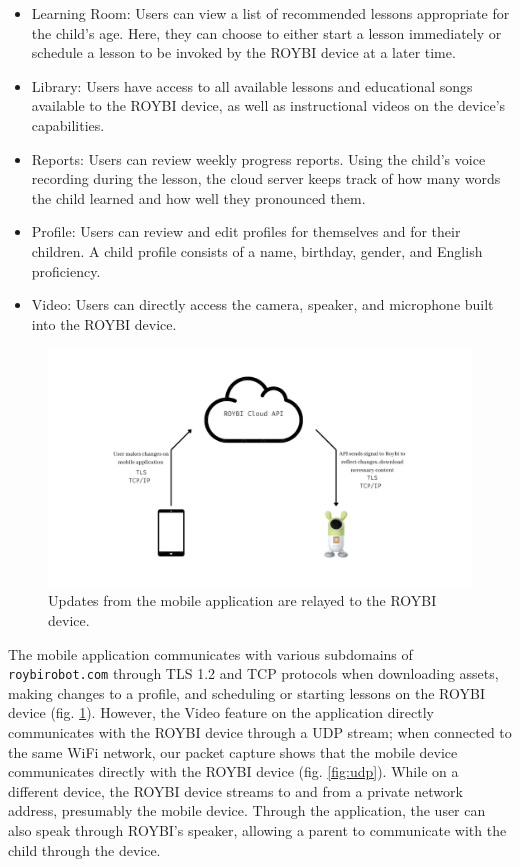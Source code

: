 \documentclass[12pt]{ucthesis}
\begin{document}
\begin{itemize}
    \item Learning Room: Users can view a list of recommended lessons appropriate for the child's age. Here, they can choose to either start a lesson immediately or schedule a lesson to be invoked by the ROYBI device at a later time.
    \item Library: Users have access to all available lessons and educational songs available to the ROYBI device, as well as instructional videos on the device's capabilities.
    \item Reports: Users can review weekly progress reports. Using the child's voice recording during the lesson, the cloud server keeps track of how many words the child learned and how well they pronounced them.
    \item Profile: Users can review and edit profiles for themselves and for their children. A child profile consists of a name, birthday, gender, and English proficiency.
    \item Video: Users can directly access the camera, speaker, and microphone built into the ROYBI device.
\end{itemize}

\begin{figure}
    \includegraphics[width=\textwidth]{changes on app.jpg}
    \caption{Updates from the mobile application are relayed to the ROYBI device.}
    \label{fig:roybiapp}
\end{figure}

The mobile application communicates with various subdomains of \texttt{roybirobot.com} through TLS 1.2 and TCP protocols when downloading assets, making changes to a profile, and scheduling or starting lessons on the ROYBI device (fig. \ref{fig:roybiapp}). However, the Video feature on the application directly communicates with the ROYBI device through a UDP stream; when connected to the same WiFi network, our packet capture shows that the mobile device communicates directly with the ROYBI device (fig. \ref{fig:udp}). While on a different device, the ROYBI device streams to and from a private network address, presumably the mobile device. Through the application, the user can also speak through ROYBI's speaker, allowing a parent to communicate with the child through the device.
\end{document}

